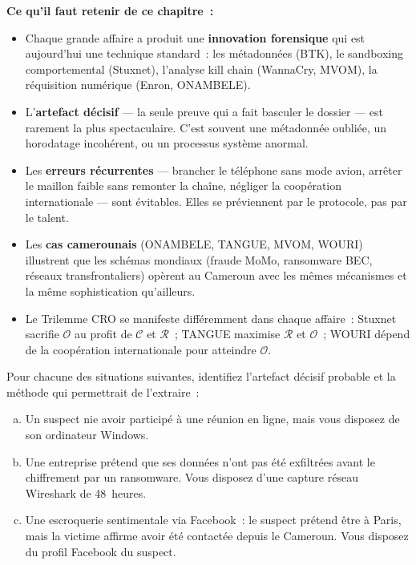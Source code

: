 \begin{boxresume}
\textbf{Ce qu'il faut retenir de ce chapitre~:}

\begin{itemize}
    \item Chaque grande affaire a produit une \textbf{innovation forensique}
          qui est aujourd'hui une technique standard~: les métadonnées (BTK),
          le sandboxing comportemental (Stuxnet), l'analyse kill chain
          (WannaCry, MVOM), la réquisition numérique (Enron, ONAMBELE).

    \item L'\textbf{artefact décisif} --- la seule preuve qui a fait basculer
          le dossier --- est rarement la plus spectaculaire. C'est souvent
          une métadonnée oubliée, un horodatage incohérent, ou un processus
          système anormal.

    \item Les \textbf{erreurs récurrentes} --- brancher le téléphone sans
          mode avion, arrêter le maillon faible sans remonter la chaîne,
          négliger la coopération internationale --- sont évitables. Elles
          se préviennent par le protocole, pas par le talent.

    \item Les \textbf{cas camerounais} (ONAMBELE, TANGUE, MVOM, WOURI)
          illustrent que les schémas mondiaux (fraude MoMo, ransomware BEC,
          réseaux transfrontaliers) opèrent au Cameroun avec les mêmes
          mécanismes et la même sophistication qu'ailleurs.

    \item Le Trilemme CRO se manifeste différemment dans chaque affaire~:
          Stuxnet sacrifie $\mathcal{O}$ au profit de $\mathcal{C}$ et
          $\mathcal{R}$~; TANGUE maximise $\mathcal{R}$ et $\mathcal{O}$~;
          WOURI dépend de la coopération internationale pour atteindre
          $\mathcal{O}$.
\end{itemize}
\end{boxresume}

\bigskip

\begin{boxexo}[title={\ding{45}\quad Exercice~3.1 --- Identification de l'artefact décisif \niveaubase}]
Pour chacune des situations suivantes, identifiez l'artefact décisif probable
et la méthode qui permettrait de l'extraire~:

\begin{enumerate}[(a)]
    \item Un suspect nie avoir participé à une réunion en ligne, mais vous
          disposez de son ordinateur Windows.
    \item Une entreprise prétend que ses données n'ont pas été exfiltrées
          avant le chiffrement par un ransomware. Vous disposez d'une
          capture réseau Wireshark de 48~heures.
    \item Une escroquerie sentimentale via Facebook~: le suspect prétend
          être à Paris, mais la victime affirme avoir été contactée depuis
          le Cameroun. Vous disposez du profil Facebook du suspect.
\end{enumerate}
\end{boxexo}

